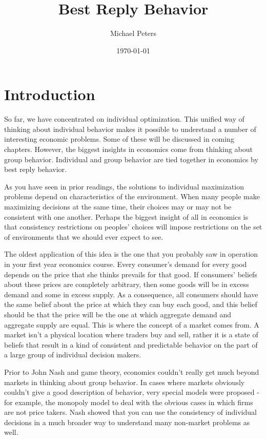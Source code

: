 \documentclass[12pt]{article}
\begin{document}
\title{Best Reply Behavior}
\author{Michael Peters}
\date{\today}
\maketitle

\section{Introduction}
So far, we have concentrated on individual optimization. This unified way of
thinking about individual behavior makes it possible to understand a number of
interesting economic problems. Some of these will be discussed in coming
chapters. However, the biggest insights in economics come from thinking about
group behavior. Individual and group behavior are tied together in economics
by best reply behavior.

As you have seen in prior readings, the solutions to individual maximization
problems depend on characteristics of the environment. When many people make
maximizing decisions at the same time, their choices may or may not be
consistent with one another. Perhaps the biggest insight of all in economics
is that consistency restrictions on peoples' choices will impose restrictions
on the set of environments that we should ever expect to see.

The oldest application of this idea is the one that you probably saw in
operation in your first year economics course. Every consumer's demand for
every good depends on the price that she thinks prevails for that good. If
consumers' beliefs about these prices are completely arbitrary, then some
goods will be in excess demand and some in excess supply. As a consequence,
all consumers should have the same belief about the price at which they can
buy each good, and this belief should be that the price will be the one at
which aggregate demand and aggregate supply are equal. This is where the
concept of a market comes from. A market isn't a physical location where
traders buy and sell, rather it is a state of beliefs that result in a kind of
consistent and predictable behavior on the part of a large group of individual
decision makers.

Prior to John Nash and game theory, economics couldn't really get much beyond
markets in thinking about group behavior. In cases where markets obviously
couldn't give a good description of behavior, very special models were
proposed - for example, the monopoly model to deal with the obvious cases in
which firms are not price takers. Nash showed that you can use the consistency
of individual decisions in a much broader way to understand many non-market
problems as well.
\end{document}

